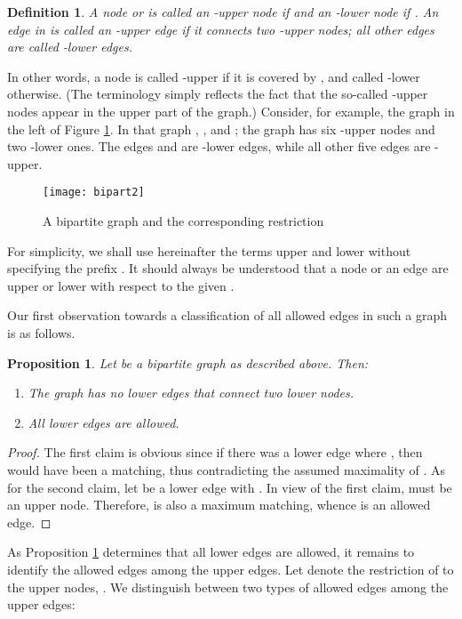 \documentclass[times, 11pt]{article}
\newtheorem{proposition}[theorem]{Proposition}
\newtheorem{definition}[theorem]{Definition}
\begin{document}
\begin{definition} A node  or  is called an -upper node if  and an -lower node if .
An edge  in  is called an -upper edge if it connects two -upper nodes; all other edges are called -lower edges.
\end{definition}

In other words, a node is called -upper if it is covered by , and called -lower otherwise.
(The
terminology simply reflects the fact that the so-called -upper
nodes appear in the upper part of the graph.) Consider, for
example, the graph in the left of Figure \ref{bipart2}. In that
graph , , and ; the graph has six -upper nodes and two
-lower ones. The edges  and  are -lower
edges, while all other five edges are -upper.

\begin{figure}[h!!!]
\begin{center}
{\texttt{[image: bipart2]}}
\caption{\label{bipart2} A bipartite graph  and the corresponding restriction }
\end{center}
\end{figure}

For simplicity, we shall use hereinafter the terms upper and lower without specifying the prefix . It should always be understood that a node or an edge
are upper or lower with respect to the given .

Our first observation towards a classification of all allowed edges in such a graph is as follows.
\begin{proposition}\label{prop45} Let  be a bipartite graph as described above. Then:
\begin{enumerate}
\item The graph has no lower edges that connect two lower nodes.
\item All lower edges are allowed.
\end{enumerate}
\end{proposition}

\begin{proof} The first claim is obvious since if there was a lower edge  where , then  would have been a matching, thus
contradicting the assumed maximality of . As for the second claim, let  be a lower edge with . In view of the first claim,  must be an upper
node.
Therefore,  is also a maximum matching, whence  is an allowed edge.
\end{proof}

As Proposition \ref{prop45} determines that all lower edges are allowed, it remains to identify the allowed edges among the upper edges.
Let  denote the restriction of  to the upper nodes, .
We distinguish between two types of allowed edges among the upper edges:
\end{document}
